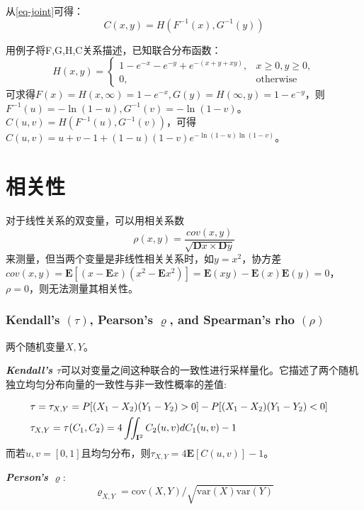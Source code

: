 \documentclass[UTF8]{ctexart}
\begin{document}
从\cref{eq-joint}可得：
\begin{equation}
    C(x,y) = H(F^{-1}(x),G^{-1}(y))
    \label{eq-copula}
\end{equation}

用例子将F,G,H,C关系描述，已知联合分布函数：
\begin{equation*}
    H(x,y)=
    \begin{cases}
        1-e^{-x}-e^{-y}+e^{-(x+y+xy)}, &x\geq0,y\geq0, \\
        0, &\text{otherwise}
    \end{cases}
\end{equation*}
可求得$F(x)=H(x,\infty) = 1-e^{-x},G(y)=H(\infty,y)=1-e^{-y}$，则$F^{-1}(u) = -\ln(1-u),G^{-1}(v)=-\ln(1-v)$。$C(u,v) = H(F^{-1}(u),G^{-1}(v))$，可得$C(u,v) = u+v-1+(1-u)(1-v)e^{-\ln(1-u)\ln(1-v)}$。


\section{相关性}
对于线性关系的双变量，可以用相关系数\[
    \rho(x,y) = \dfrac{cov(x,y)}{\sqrt{\mathbf{D}x \times \mathbf{D}y}}
\]
来测量，但当两个变量是非线性相关关系时，如$y=x^2$，协方差$cov(x,y)=\mathbf{E}[(x-\mathbf{E}x)(x^2-\mathbf{E}x^2)] = \mathbf{E}(xy)-\mathbf{E}(x)\mathbf{E}(y)= 0$，$\rho=0$，则无法测量其相关性。




\subsubsection{Kendall's $(\tau)$, Pearson's $\varrho$, and Spearman's rho $(\rho)$}
两个随机变量$X,Y$。

\emph{\textbf{\textcolor[rgb]{1,0,0}{Kendall's $\tau$}}}可以对变量之间这种联合的一致性进行采样量化。它描述了两个随机独立均匀分布向量的一致性与非一致性概率的差值\cite{Montes2015}:

\begin{eqnarray}
    &\tau = \tau_{X,Y} = P[(X_1-X_2)(Y_1-Y_2) > 0] - P[(X_1-X_2)(Y_1-Y_2)<0]& \notag \\
    &\tau_{X,Y} = \tau(C_1,C_2) = 4\iint_{\mathbf{I}^2}C_2(u,v)dC_{1}(u,v)-1&
    \label{eq-tau}
\end{eqnarray}
而若$u,v = [0,1]$且均匀分布，则$\tau_{X,Y} = 4\mathbf{E}[C(u,v)]-1$。




\emph{\textbf{\textcolor[rgb]{1,0,0}{Person's $\varrho$}}}:
\begin{equation}   
    \label{eq-varrho}
    \varrho_{X,Y} = \text{cov}(X,Y)/\sqrt{\text{var}(X)\text{var}(Y)}
\end{equation}
\end{document}
